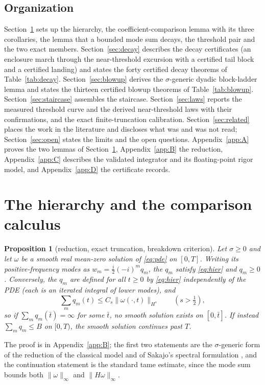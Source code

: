 \documentclass[11pt,a4paper]{article}
\theoremstyle{plain}
\newtheorem{proposition}[theorem]{Proposition}
\theoremstyle{definition}
\newcommand{\nrm}[1]{\lVert #1 \rVert}
\begin{document}
\subsection{Organization}
Section~\ref{sec:comparison} sets up the hierarchy, the coefficient-comparison lemma with its three corollaries, the lemma that a bounded mode sum decays, the threshold pair and the two exact members. Section~\ref{sec:decay} describes the decay certificates (an enclosure march through the near-threshold excursion with a certified tail block and a certified landing) and states the forty certified decay theorems of Table~\ref{tab:decay}. Section~\ref{sec:blowup} derives the $\sigma$-generic dyadic block-ladder lemma and states the thirteen certified blowup theorems of Table~\ref{tab:blowup}. Section~\ref{sec:staircase} assembles the staircase. Section~\ref{sec:laws} reports the measured threshold curve and the derived near-threshold laws with their confirmations, and the exact finite-truncation calibration. Section~\ref{sec:related} places the work in the literature and discloses what was and was not read; Section~\ref{sec:open} states the limits and the open questions. Appendix~\ref{app:A} proves the two lemmas of Section~\ref{sec:comparison}, Appendix~\ref{app:B} the reduction, Appendix~\ref{app:C} describes the validated integrator and its floating-point rigor model, and Appendix~\ref{app:D} the certificate records.

\section{The hierarchy and the comparison calculus}\label{sec:comparison}

\begin{proposition}[reduction, exact truncation, breakdown criterion]\label{prop:reduction}
Let $\sigma\ge0$ and let $\omega$ be a smooth real mean-zero solution of \eqref{eq:pde} on $[0,T]$. Writing its positive-frequency modes as $w_m=\tfrac{i}{2}(-i)^mq_m$, the $q_m$ satisfy \eqref{eq:hier} and $q_m\ge0$. Conversely, the $q_m$ are defined for all $t\ge0$ by \eqref{eq:hier} independently of the PDE (each is an iterated integral of lower modes), and
\begin{equation}\label{eq:hsbound}
\sum_mq_m(t)\le C_s\nrm{\omega(\cdot,t)}_{H^s}\qquad(s>\tfrac12),
\end{equation}
so if $\sum_mq_m(\bar t)=\infty$ for some $\bar t$, no smooth solution exists on $[0,\bar t]$. If instead $\sum_mq_m\le B$ on $[0,T)$, the smooth solution continues past $T$.
\end{proposition}
The proof is in Appendix~\ref{app:B}; the first two statements are the $\sigma$-generic form of the reduction of the classical model \cite{CLM85} and of Sakajo's spectral formulation \cite[\S2]{Sak03b}, and the continuation statement is the standard tame estimate, since the mode sum bounds both $\nrm{\omega}_\infty$ and $\nrm{H\omega}_\infty$.
\end{document}
